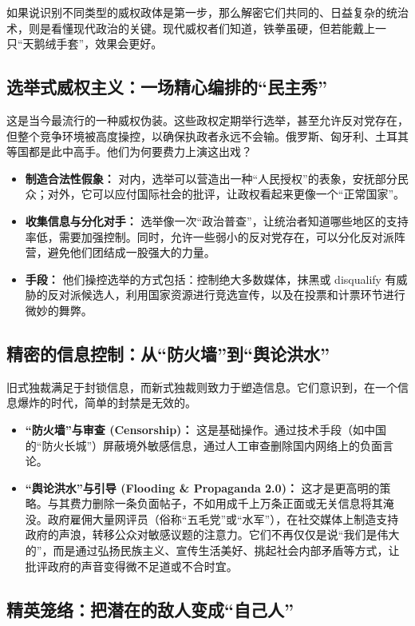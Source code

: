 \documentclass[a5paper, 11pt, openany]{ctexbook}
\begin{document}
如果说识别不同类型的威权政体是第一步，那么解密它们共同的、日益复杂的统治术，则是看懂现代政治的关键。现代威权者们知道，铁拳虽硬，但若能戴上一只“天鹅绒手套”，效果会更好。

\subsection{选举式威权主义：一场精心编排的“民主秀”}

这是当今最流行的一种威权伪装。这些政权定期举行选举，甚至允许反对党存在，但整个竞争环境被高度操控，以确保执政者永远不会输。俄罗斯、匈牙利、土耳其等国都是此中高手。他们为何要费力上演这出戏？
\begin{itemize}
    \item \textbf{制造合法性假象：} 对内，选举可以营造出一种“人民授权”的表象，安抚部分民众；对外，它可以应付国际社会的批评，让政权看起来更像一个“正常国家”。
    \item \textbf{收集信息与分化对手：} 选举像一次“政治普查”，让统治者知道哪些地区的支持率低，需要加强控制。同时，允许一些弱小的反对党存在，可以分化反对派阵营，避免他们团结成一股强大的力量。
    \item \textbf{手段：} 他们操控选举的方式包括：控制绝大多数媒体，抹黑或 disqualify 有威胁的反对派候选人，利用国家资源进行竞选宣传，以及在投票和计票环节进行微妙的舞弊。
\end{itemize}

\subsection{精密的信息控制：从“防火墙”到“舆论洪水”}

旧式独裁满足于封锁信息，而新式独裁则致力于塑造信息。它们意识到，在一个信息爆炸的时代，简单的封禁是无效的。
\begin{itemize}
    \item \textbf{“防火墙”与审查 (Censorship)：} 这是基础操作。通过技术手段（如中国的“防火长城”）屏蔽境外敏感信息，通过人工审查删除国内网络上的负面言论。
    \item \textbf{“舆论洪水”与引导 (Flooding \& Propaganda 2.0)：} 这才是更高明的策略。与其费力删除一条负面帖子，不如用成千上万条正面或无关信息将其淹没。政府雇佣大量网评员（俗称“五毛党”或“水军”），在社交媒体上制造支持政府的声浪，转移公众对敏感议题的注意力。它们不再仅仅是说“我们是伟大的”，而是通过弘扬民族主义、宣传生活美好、挑起社会内部矛盾等方式，让批评政府的声音变得微不足道或不合时宜。
\end{itemize}

\subsection{精英笼络：把潜在的敌人变成“自己人”}
\end{document}
